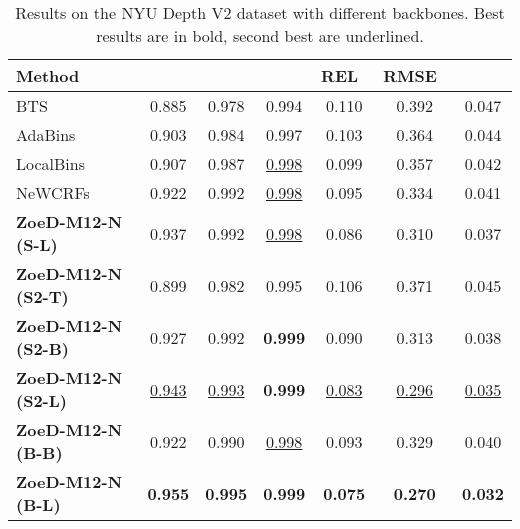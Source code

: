 \documentclass[10pt,twocolumn,letterpaper]{article}
\begin{document}
\begin{table}[!htb]
\centering
\setlength{\tabcolsep}{2pt} \small
\begin{tabular}{@{}lcccccc@{}}
\toprule
Method &  &  &  & REL~ & RMSE~ & \\ \midrule
BTS~\cite{bts_lee2019big}          & 0.885 & 0.978 & 0.994 & 0.110 & 0.392 & 0.047 \\ 
AdaBins~\cite{bhat2021adabins}     & 0.903 & 0.984 & 0.997 & 0.103 & 0.364 & 0.044 \\ 
LocalBins~\cite{bhat2022localbins} & 0.907 & 0.987 & \underline{0.998} & 0.099 & 0.357 & 0.042 \\ 
NeWCRFs~\cite{yuan2022new}         & 0.922 & 0.992 & \underline{0.998} & 0.095 & 0.334 & 0.041 \\ \midrule
\textbf{ZoeD-M12-N (S-L)}    & 0.937  & 0.992 & \underline{0.998} & 0.086 &  0.310 & 0.037   \\ 
\textbf{ZoeD-M12-N (S2-T)}     & 0.899     & 0.982     & 0.995     & 0.106     & 0.371     & 0.045    \\ 
\textbf{ZoeD-M12-N (S2-B)}    & 0.927     & 0.992     & \textbf{0.999}     & 0.090     & 0.313     & 0.038    \\ 
\textbf{ZoeD-M12-N (S2-L)}    & \underline{0.943}     & \underline{0.993}     & \textbf{0.999}    & \underline{0.083}     & \underline{0.296}     & \underline{0.035}   \\ 
\textbf{ZoeD-M12-N (B-B)}       & 0.922 & 0.990 &  \underline{0.998} & 0.093 & 0.329  & 0.040    \\ 
\textbf{ZoeD-M12-N (B-L)}      & \textbf{0.955} &        \textbf{0.995} &        \textbf{0.999} &             \textbf{0.075} &           \textbf{0.270} &            \textbf{0.032} \\
\bottomrule
\end{tabular}
\caption{Results on the NYU Depth V2 dataset with different backbones. Best results are in bold, second best are underlined.}
\label{tab:nyu-backbones}
\end{table}

\clearpage
\end{document}

